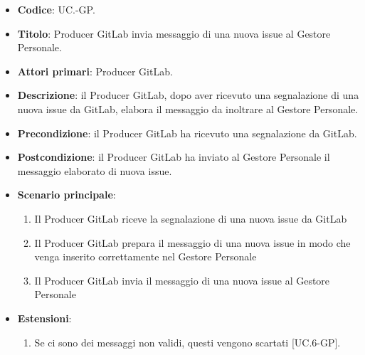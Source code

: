 	\begin{itemize}
		\item \textbf{Codice}: UC\theuccount.\thesubuccount-GP.
		\item \textbf{Titolo}: Producer GitLab invia messaggio di una nuova issue al Gestore Personale.
		\item \textbf{Attori primari}: Producer GitLab.
		\item \textbf{Descrizione}: il Producer GitLab, dopo aver ricevuto una segnalazione di una nuova issue da GitLab, elabora il messaggio da inoltrare al Gestore Personale.
		\item \textbf{Precondizione}: il Producer GitLab ha ricevuto una segnalazione da GitLab.
		\item \textbf{Postcondizione}: il Producer GitLab ha inviato al Gestore Personale il messaggio
		elaborato di nuova issue.
		\item \textbf{Scenario principale}:
		\begin{enumerate}
			\item Il Producer GitLab riceve la segnalazione di una nuova issue da GitLab
			\item Il Producer GitLab prepara il messaggio di una nuova issue in modo che venga inserito correttamente
			nel Gestore Personale
			\item Il Producer GitLab invia il messaggio di una nuova issue al Gestore Personale
		\end{enumerate}
		\item \textbf{Estensioni}:
		\begin{enumerate}
			\item Se ci sono dei messaggi non validi, questi vengono scartati [UC\theuccount.6-GP].
		\end{enumerate}
	\end{itemize}


